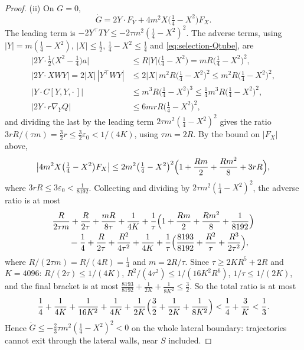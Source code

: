 \begin{proof}
(ii) On $G=0$,
\[
\dot G=2Y\cdot F_Y+4m^2X\bigl(\tfrac14-X^2\bigr)F_X .
\]
The leading term is $-2Y^{\top}TY\le-2\tau m^2(\frac14-X^2)^2$. The adverse terms, using $|Y|=m(\frac14-X^2)$, $|X|\le\frac12$, $\frac14-X^2\le\frac14$ and \eqref{eq:selection-Qtube}, are
\begin{equation}\label{eq:selection-tubeterms}
\begin{aligned}
\bigl|2Y\cdot\tfrac12\bigl(X^2-\tfrac14\bigr)a\bigr|&\le R|Y|\bigl(\tfrac14-X^2\bigr)=mR\bigl(\tfrac14-X^2\bigr)^2,\\
|2Y\cdot XWY|=2|X|\,|Y^{\top}WY|&\le2|X|\,m^2R\bigl(\tfrac14-X^2\bigr)^2\le m^2R\bigl(\tfrac14-X^2\bigr)^2,\\
\bigl|Y\cdot C[Y,Y,\cdot\,]\bigr|&\le m^3R\bigl(\tfrac14-X^2\bigr)^3\le\tfrac14m^3R\bigl(\tfrac14-X^2\bigr)^2,\\
|2Y\cdot r\nabla_YQ|&\le6mrR\bigl(\tfrac14-X^2\bigr)^2,
\end{aligned}
\end{equation}
and dividing the last by the leading term $2\tau m^2(\frac14-X^2)^2$ gives the ratio $3rR/(\tau m)=\frac32r\le\frac32\varepsilon_0<1/(4K)$, using $\tau m=2R$. By the bound on $|F_X|$ above,
\[
\bigl|4m^2X\bigl(\tfrac14-X^2\bigr)F_X\bigr|\le2m^2\bigl(\tfrac14-X^2\bigr)^2\Bigl(1+\frac{Rm}2+\frac{Rm^2}8+3rR\Bigr),
\]
where $3rR\le3\varepsilon_0<\frac1{8192}$. Collecting and dividing by $2\tau m^2(\frac14-X^2)^2$, the adverse ratio is at most
\begin{equation}\label{eq:selection-tubeledger}
\begin{aligned}
&\frac R{2\tau m}+\frac R{2\tau}+\frac{mR}{8\tau}+\frac1{4K}+\frac1\tau\Bigl(1+\frac{Rm}2+\frac{Rm^2}8+\frac1{8192}\Bigr)\\
&\qquad=\frac14+\frac R{2\tau}+\frac{R^2}{4\tau^2}+\frac1{4K}+\frac1\tau\Bigl(\frac{8193}{8192}+\frac{R^2}\tau+\frac{R^3}{2\tau^2}\Bigr),
\end{aligned}
\end{equation}
where $R/(2\tau m)=R/(4R)=\frac14$ and $m=2R/\tau$. Since $\tau\ge2KR^5+2R$ and $K=4096$: $R/(2\tau)\le1/(4K)$, $R^2/(4\tau^2)\le1/(16K^2R^6)$, $1/\tau\le1/(2K)$, and the final bracket is at most $\frac{8193}{8192}+\frac1{2K}+\frac1{8K^2}\le\frac32$. So the total ratio is at most
\[
\frac14+\frac1{4K}+\frac1{16K^2}+\frac1{4K}+\frac1{2K}\Bigl(\frac32+\frac1{2K}+\frac1{8K^2}\Bigr)<\frac14+\frac3K<\frac13 .
\]
Hence $\dot G\le-\frac23\tau m^2(\frac14-X^2)^2<0$ on the whole lateral boundary: trajectories cannot exit through the lateral walls, near $S$ included.


\end{proof}

